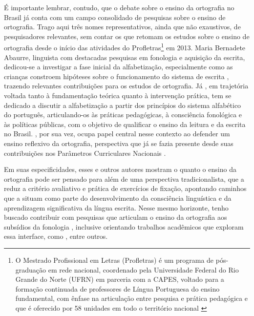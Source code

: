 \documentclass[portuguese]{textolivre}
\begin{document}
É importante lembrar, contudo, que o debate sobre o ensino da ortografia no Brasil já conta com um campo consolidado de pesquisas sobre o ensino de ortografia. Trago aqui três nomes representativos, ainda que não exaustivos, de pesquisadores relevantes, sem contar os que retomam os estudos sobre o ensino de ortografia desde o início das atividades do Profletras\footnote{O Mestrado Profissional em Letras (Profletras) é um programa de pós-graduação em rede nacional, coordenado pela Universidade Federal do Rio Grande do Norte (UFRN) em parceria com a CAPES, voltado para a formação continuada de professores de Língua Portuguesa do ensino fundamental, com ênfase na articulação entre pesquisa e prática pedagógica e que é oferecido por 58 unidades em todo o território nacional \cite{ufrn2025profletras}} em 2013. Maria Bernadete Abaurre, linguista com destacadas pesquisas em fonologia e aquisição da escrita, dedicou-se a investigar a fase inicial da alfabetização, especialmente como as crianças constroem hipóteses sobre o funcionamento do sistema de escrita \cite{abaurre1986alfabetizacao,abaurre1991segmentacao,abaurre1999refaccao,abaurre2011escritaespontanea,abaurrecoudry2008afasicos,abaurre1997cenas}, trazendo relevantes contribuições para os estudos de ortografia. Já \textcite{scliarcabral2003a_guia,scliarcabral2003b_principios,scliarcabral2011desafios,scliarcabral2015melhoria,scliarcabral2019politicas,scliarcabral2022falhado}, em trajetória voltada tanto à fundamentação teórica quanto à intervenção prática, tem se dedicado a discutir a alfabetização a partir dos princípios do sistema alfabético do português, articulando-os às práticas pedagógicas, à consciência fonológica e às políticas públicas, com o objetivo de qualificar o ensino da leitura e da escrita no Brasil. \textcite{morais2002ortografia,morais2005aprendizado}, por sua vez, ocupa papel central nesse contexto ao defender um ensino reflexivo da ortografia, perspectiva que já se fazia presente desde suas contribuições nos Parâmetros Curriculares Nacionais \cite{brasil1997pcnlp}.

Em suas especificidades, esses e outros autores mostram o quanto o ensino da ortografia pode ser pensado para além de uma perspectiva tradicionalista, que a reduz a critério avaliativo e prática de exercícios de fixação, apontando caminhos que a situam como parte do desenvolvimento da consciência linguística e da aprendizagem significativa da língua escrita. Nesse mesmo horizonte, tenho buscado contribuir com pesquisas que articulam o ensino da ortografia aos subsídios da fonologia \cite{roberto2016ortografia,roberto2023caminhos}, inclusive orientando trabalhos acadêmicos que exploram essa interface, como \textcite{cesar2017acrescimo,ramos2018sonoridade,marins2024monotongacao,marinsroberto2025parlaventura}, entre outros.
\end{document}
